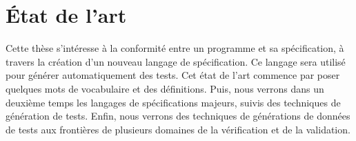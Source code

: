 \chapter{État de l'art}
\label{chapter:state}

\minitoc

Cette thèse s'intéresse à la conformité entre un programme et sa spécification,
à travers la création d'un nouveau langage de spécification. Ce langage sera
utilisé pour générer automatiquement des tests. Cet état de l'art commence par
poser quelques mots de vocabulaire et des définitions. Puis, nous verrons dans
un deuxième temps les langages de spécifications majeurs, suivis des techniques
de génération de tests. Enfin, nous verrons des techniques de générations de
données de tests aux frontières de plusieurs domaines de la vérification et de
la validation.


